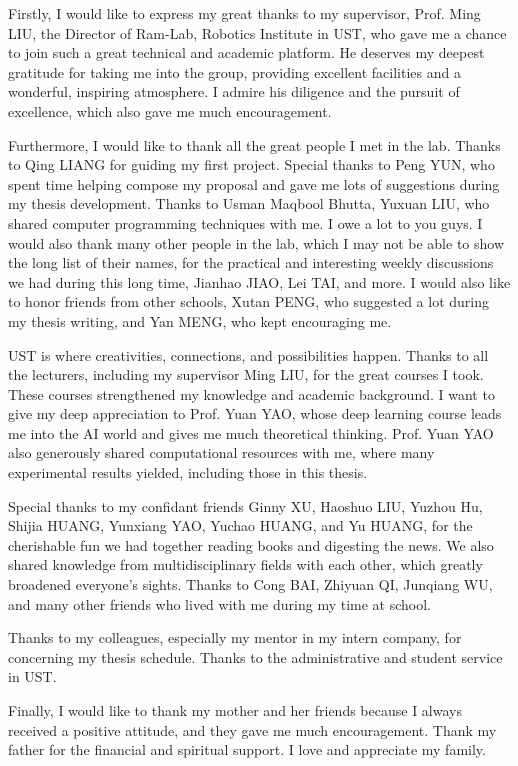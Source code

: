 \acknowledgments

Firstly, I would like to express my great thanks to my supervisor, Prof. Ming LIU, the Director of Ram-Lab, Robotics Institute in UST, who gave me a chance to join such a great technical and academic platform. He deserves my deepest gratitude for taking me into the group, providing excellent facilities and a wonderful, inspiring atmosphere. I admire his diligence and the pursuit of excellence, which also gave me much encouragement.

Furthermore, I would like to thank all the great people I met in the lab. Thanks to Qing LIANG for guiding my first project. Special thanks to Peng YUN, who spent time helping compose my proposal and gave me lots of suggestions during my thesis development. Thanks to Usman Maqbool Bhutta, Yuxuan LIU, who shared computer programming techniques with me. I owe a lot to you guys. I would also thank many other people in the lab, which I may not be able to show the long list of their names, for the practical and interesting weekly discussions we had during this long time, Jianhao JIAO, Lei TAI, and more. I would also like to honor friends from other schools, Xutan PENG, who suggested a lot during my thesis writing, and Yan MENG, who kept encouraging me.

UST is where creativities, connections, and possibilities happen. Thanks to all the lecturers, including my supervisor Ming LIU, for the great courses I took. These courses strengthened my knowledge and academic background. I want to give my deep appreciation to Prof. Yuan YAO, whose deep learning course leads me into the AI world and gives me much theoretical thinking. Prof. Yuan YAO also generously shared computational resources with me, where many experimental results yielded, including those in this thesis.

Special thanks to my confidant friends Ginny XU, Haoshuo LIU, Yuzhou Hu, Shijia HUANG, Yunxiang YAO, Yuchao HUANG, and Yu HUANG, for the cherishable fun we had together reading books and digesting the news. We also shared knowledge from multidisciplinary fields with each other, which greatly broadened everyone's sights. Thanks to Cong BAI, Zhiyuan QI, Junqiang WU, and many other friends who lived with me during my time at school.

Thanks to my colleagues, especially my mentor in my intern company, for concerning my thesis schedule. Thanks to the administrative and student service in UST.

Finally, I would like to thank my mother and her friends because I always received a positive attitude, and they gave me much encouragement. Thank my father for the financial and spiritual support. I love and appreciate my family.

\endacknowledgments
